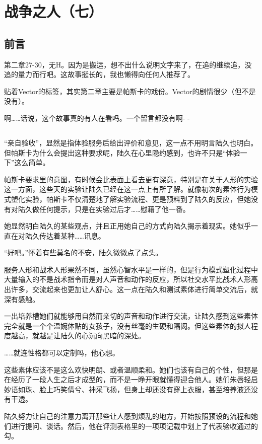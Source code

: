 \chapter{战争之人（七）}
\section*{前言}
第二章27-30，无H。因为是搬运，想不出什么说明文字来了，在追的继续追，没追的量力而行吧。这故事挺长的，我也懒得向任何人推荐了。

贴着Vector的标签，其实第二章主要是帕斯卡的戏份。Vector的剧情很少（但不是没有）。

啊……话说，这个故事真的有人在看吗。一个留言都没有啊- -

\lineseparator

\section*{}

“亲自验收”，显然是指体验服务后给出评价和意见，这一点不用明言陆久也明白。但帕斯卡为什么会提出这种要求呢，陆久在心里隐约感到，也许不只是“体验一下”这么简单。

帕斯卡要求里的意图，有时候会比表面上看去更有深意，特别是在关于人形的实验这一方面，这些天的实验让陆久已经在这一点上有所了解。就像初次的素体行为模式塑化实验，帕斯卡不仅清楚地了解实验流程、更是预料到了陆久的反应，但她没有对陆久做任何提示，只是在实验过后才……慰藉了他一番。

她显然明白陆久的某些观点，并且正用她自己的方式向陆久揭示着现实。她似乎一直在对陆久传达着某种……讯息。

“好吧。”怀着有些莫名的不安，陆久微微点了点头。

服务人形和战术人形果然不同，虽然心智水平是一样的，但是行为模式塑化过程中大量输入的不是战术指令而是对人声音和动作的反应，所以社交水平比战术人形高出许多，交流起来也更加让人舒心。这一点在陆久和测试素体进行简单交流后，就深有感触。

一出培养槽她们就能够用自然而亲切的声音和动作进行交流，让陆久感到这些素体完全就是一个个温婉体贴的女孩子，没有丝毫的生硬和隔阂。但这些素体的拟人程度越高，就越是让陆久的心沉向黑暗的深处。

……就连性格都可以定制吗，他心想。

这些素体应该不是这么欢快明朗、或者温顺柔和。她们也该有自己的个性，但那是在经历了一段人生之后才成型的，而不是一睁开眼就懂得迎合他人。她们朱唇轻启妙语如珠、脸上巧笑倩兮、神采飞扬，但身上却还没有穿上衣服，甚至培养液还没有干透。

陆久努力让自己的注意力离开那些让人感到烦乱的地方，开始按照预设的流程和她们进行提问、谈话。然后，他在评测表格里的一项项记载中划上了代表验收通过的勾。

